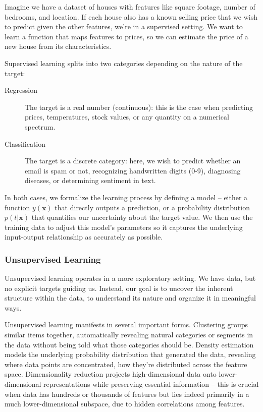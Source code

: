 Imagine we have a dataset of houses with features like square footage, number of bedrooms, and location. If each house also has a known selling price that we wish to predict given the other features, we're in a supervised setting. We want to learn a function that maps features to prices, so we can estimate the price of a new house from its characteristics.

Supervised learning splits into two categories depending on the nature of the target:

\begin{description}
\item[Regression] The target is a real number (continuous): this is the case when predicting prices, temperatures, stock values, or any quantity on a numerical spectrum.

\item[Classification] The target is a discrete category: here, we wish to predict whether an email is spam or not, recognizing handwritten digits (0-9), diagnosing diseases, or determining sentiment in text.
\end{description}

In both cases, we formalize the learning process by defining a model -- either a function $y(\mathbf{x})$ that directly outputs a prediction, or a probability distribution $p(t|\mathbf{x})$ that quantifies our uncertainty about the target value. We then use the training data to adjust this model's parameters so it captures the underlying input-output relationship as accurately as possible.


\subsubsection*{Unsupervised Learning}

Unsupervised learning operates in a more exploratory setting. We have data, but no explicit targets guiding us. Instead, our goal is to uncover the inherent structure within the data, to understand its nature and organize it in meaningful ways.

Unsupervised learning manifests in several important forms. \alert{Clustering} groups similar items together, automatically revealing natural categories or segments in the data without being told what those categories should be. \alert{Density estimation} models the underlying probability distribution that generated the data, revealing where data points are concentrated, how they're distributed across the feature space. \alert{Dimensionality reduction} projects high-dimensional data onto lower-dimensional representations while preserving essential information -- this is crucial when data has hundreds or thousands of features but lies indeed primarily in a much lower-dimensional subspace, due to hidden correlations among features.

